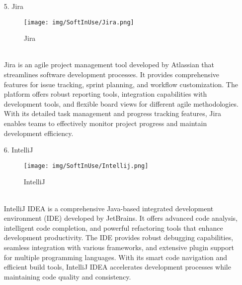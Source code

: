 \documentclass[conference]{IEEEtran}
\begin{document}
\begin{enumerate}
\item[5.] Jira
\begin{figure}[h]
\hspace{1cm}
\centering
\begin{minipage}{0.5\columnwidth}
    \texttt{[image: img/SoftInUse/Jira.png]}
    \caption{Jira}
\end{minipage}
\end{figure}\\
Jira is an agile project management tool developed by Atlassian that streamlines software development processes. It provides comprehensive features for issue tracking, sprint planning, and workflow customization. The platform offers robust reporting tools, integration capabilities with development tools, and flexible board views for different agile methodologies. With its detailed task management and progress tracking features, Jira enables teams to effectively monitor project progress and maintain development efficiency.

\clearpage

\item[6.] IntelliJ
\begin{figure}[h]
\hspace{1.5cm}
\centering
\begin{minipage}{0.4\columnwidth}
    \texttt{[image: img/SoftInUse/Intellij.png]}
    \caption{IntelliJ}
\end{minipage}
\end{figure}\\
IntelliJ IDEA is a comprehensive Java-based integrated development environment (IDE) developed by JetBrains. It offers advanced code analysis, intelligent code completion, and powerful refactoring tools that enhance development productivity. The IDE provides robust debugging capabilities, seamless integration with various frameworks, and extensive plugin support for multiple programming languages. With its smart code navigation and efficient build tools, IntelliJ IDEA accelerates development processes while maintaining code quality and consistency.\\


\end{enumerate}
\end{document}
